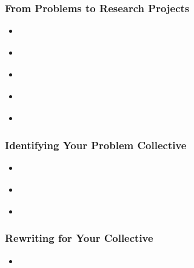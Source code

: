 \documentclass[11pt]{article}
\begin{document}
\subsubsection{From Problems to Research Projects}
\begin{itemize}
\item  \begin{exercise}
\end{exercise}

\item \begin{exercise}
\end{exercise} 

\item \begin{exercise}
\end{exercise}

\item \begin{exercise}
\end{exercise}

\item \begin{exercise}
\end{exercise}
\end{itemize}
\subsubsection{Identifying Your Problem Collective}
\begin{itemize}
\item  \begin{exercise}
\end{exercise}

\item  \begin{exercise}
\end{exercise}

\item  \begin{exercise}
\end{exercise}
\end{itemize}
\subsubsection{Rewriting for Your Collective}
\begin{itemize}
\item \begin{exercise}
\end{exercise}
\end{itemize}
\end{document}
